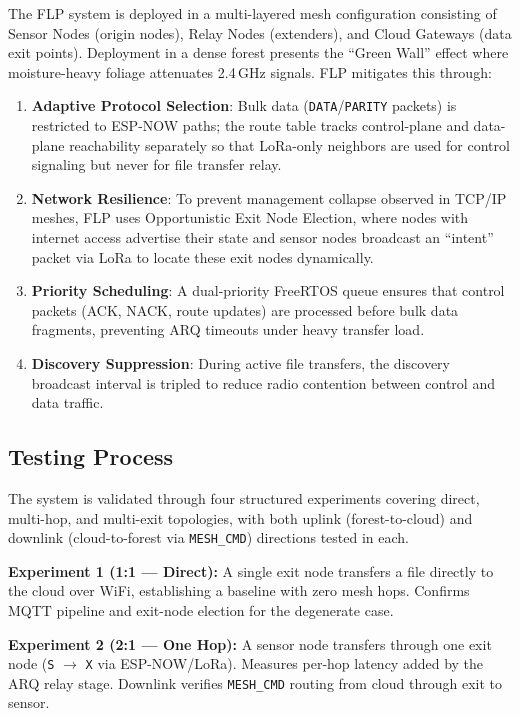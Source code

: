 \documentclass[conference]{IEEEtran}
\begin{document}
The FLP system is deployed in a multi-layered mesh configuration consisting of Sensor Nodes (origin nodes), Relay Nodes (extenders), and Cloud Gateways (data exit points). Deployment in a dense forest presents the ``Green Wall'' effect where moisture-heavy foliage attenuates 2.4\,GHz signals. FLP mitigates this through:

\begin{enumerate}
  \item \textbf{Adaptive Protocol Selection}: Bulk data (\texttt{DATA}/\texttt{PARITY} packets) is restricted to ESP-NOW paths; the route table tracks control-plane and data-plane reachability separately so that LoRa-only neighbors are used for control signaling but never for file transfer relay.
  \item \textbf{Network Resilience}: To prevent management collapse observed in TCP/IP meshes, FLP uses Opportunistic Exit Node Election, where nodes with internet access advertise their state and sensor nodes broadcast an ``intent'' packet via LoRa to locate these exit nodes dynamically.
  \item \textbf{Priority Scheduling}: A dual-priority FreeRTOS queue ensures that control packets (ACK, NACK, route updates) are processed before bulk data fragments, preventing ARQ timeouts under heavy transfer load.
  \item \textbf{Discovery Suppression}: During active file transfers, the discovery broadcast interval is tripled to reduce radio contention between control and data traffic.
\end{enumerate}

\subsection{Testing Process}

The system is validated through four structured experiments covering direct, multi-hop, and multi-exit topologies, with both uplink (forest-to-cloud) and downlink (cloud-to-forest via \texttt{MESH\_CMD}) directions tested in each.

\textbf{Experiment 1 (1:1 — Direct):} A single exit node transfers a file directly to the cloud over WiFi, establishing a baseline with zero mesh hops. Confirms MQTT pipeline and exit-node election for the degenerate case.

\textbf{Experiment 2 (2:1 — One Hop):} A sensor node transfers through one exit node (\texttt{S} $\to$ \texttt{X} via ESP-NOW/LoRa). Measures per-hop latency added by the ARQ relay stage. Downlink verifies \texttt{MESH\_CMD} routing from cloud through exit to sensor.
\end{document}

